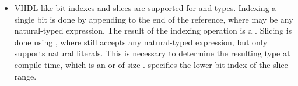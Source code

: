 \begin{itemize}
\item VHDL-like bit indexes and slices are supported for  and 
 types. Indexing a single bit is done by appending 
\code{[<position>]} to the end of the reference, where  may be 
any natural-typed expression. The result of the indexing operation is a 
. Slicing is done using , where 
 still accepts any natural-typed expression, but 
 only supports natural literals. This is necessary to determine 
the resulting type at compile time, which is an  or  
of size .  specifies the lower bit index of the
slice range.

\end{itemize}

